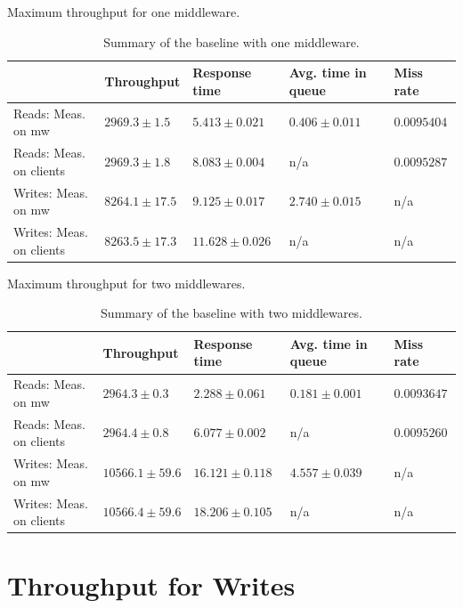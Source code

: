 \documentclass[11pt,a4paper]{article}
\begin{document}
\begin{table}[h]
\centering
{Maximum throughput for one middleware.}
\begin{tabular}{|l|p{2.3cm}|p{2.3cm}|p{2.3cm}|p{2.3cm}|}
\hline                       & Throughput        & Response time      & Avg. time in queue & Miss rate \\ 
\hline Reads: Meas. on mw       & $2969.3 \pm 1.5$  & $5.413 \pm 0.021$  & $0.406 \pm 0.011$  & $0.0095404$ \\ 
\hline Reads: Meas. on clients  & $2969.3 \pm 1.8$  & $8.083 \pm 0.004$  & n/a                & $0.0095287$ \\ 
\hline Writes: Meas. on mw      & $8264.1 \pm 17.5$ & $9.125 \pm 0.017$  & $2.740 \pm 0.015$  & n/a \\ 
\hline Writes: Meas. on clients & $8263.5 \pm 17.3$ & $11.628 \pm 0.026$ & n/a                & n/a \\ 
\hline 
\end{tabular}
\caption{Summary of the baseline with one middleware.} \label{tab:mwb1-summary}
\end{table}

\begin{table}[h]
\centering
{Maximum throughput for two middlewares.}
\begin{tabular}{|l|p{2.3cm}|p{2.3cm}|p{2.3cm}|p{2.3cm}|}
\hline                      & Throughput         & Response time      & Avg. time in queue & Miss rate \\ 
\hline Reads: Meas. on mw       & $2964.3 \pm 0.3$   & $2.288 \pm 0.061$  & $0.181 \pm 0.001$  & $0.0093647$ \\ 
\hline Reads: Meas. on clients  & $2964.4 \pm 0.8$   & $6.077 \pm 0.002$  & n/a                & $0.0095260$ \\ 
\hline Writes: Meas. on mw      & $10566.1 \pm 59.6$ & $16.121 \pm 0.118$ & $4.557 \pm 0.039$  & n/a     \\ 
\hline Writes: Meas. on clients & $10566.4 \pm 59.6$ & $18.206 \pm 0.105$ & n/a                & n/a     \\ 
\hline 
\end{tabular}
\caption{Summary of the baseline with two middlewares.} \label{tab:mwb2-summary}
\end{table}

\section{Throughput for Writes} \label{sec:tpfw}
\end{document}
